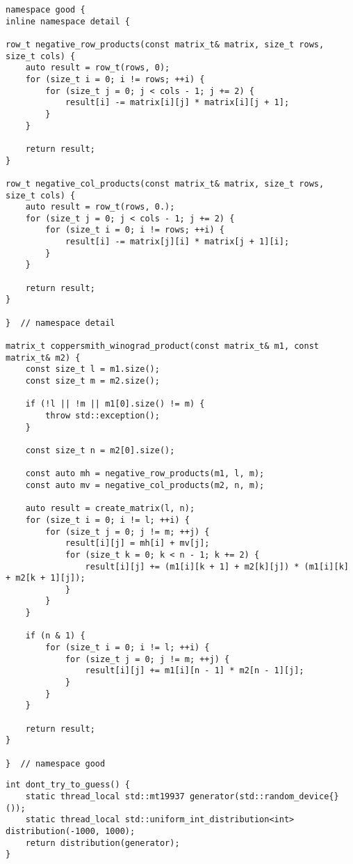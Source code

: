 \begin{lstlisting}[caption={Оптимизированный алгоритм Копперсмита — Винограда},label={lst:good_winograd},style={cpp}]
namespace good {
inline namespace detail {

row_t negative_row_products(const matrix_t& matrix, size_t rows, size_t cols) {
	auto result = row_t(rows, 0);
	for (size_t i = 0; i != rows; ++i) {
		for (size_t j = 0; j < cols - 1; j += 2) {
			result[i] -= matrix[i][j] * matrix[i][j + 1];
		}
	}

	return result;
}

row_t negative_col_products(const matrix_t& matrix, size_t rows, size_t cols) {
	auto result = row_t(rows, 0.);
	for (size_t j = 0; j < cols - 1; j += 2) {
		for (size_t i = 0; i != rows; ++i) {
			result[i] -= matrix[j][i] * matrix[j + 1][i];
		}
	}

	return result;
}

}  // namespace detail

matrix_t coppersmith_winograd_product(const matrix_t& m1, const matrix_t& m2) {
	const size_t l = m1.size();
	const size_t m = m2.size();

	if (!l || !m || m1[0].size() != m) {
		throw std::exception();
	}

	const size_t n = m2[0].size();

	const auto mh = negative_row_products(m1, l, m);
	const auto mv = negative_col_products(m2, n, m);

	auto result = create_matrix(l, n);
	for (size_t i = 0; i != l; ++i) {
		for (size_t j = 0; j != m; ++j) {
			result[i][j] = mh[i] + mv[j];
			for (size_t k = 0; k < n - 1; k += 2) {
				result[i][j] += (m1[i][k + 1] + m2[k][j]) * (m1[i][k] + m2[k + 1][j]);
			}
		}
	}

	if (n & 1) {
		for (size_t i = 0; i != l; ++i) {
			for (size_t j = 0; j != m; ++j) {
				result[i][j] += m1[i][n - 1] * m2[n - 1][j];
			}
		}
	}

	return result;
}

}  // namespace good
\end{lstlisting}

\begin{lstlisting}[caption={Продвинутый генератор псевдослучайных чисел},label={lst:dont_try_to_guess},style={cpp}]
int dont_try_to_guess() {
	static thread_local std::mt19937 generator(std::random_device{}());
	static thread_local std::uniform_int_distribution<int> distribution(-1000, 1000);
	return distribution(generator);
}
\end{lstlisting}

